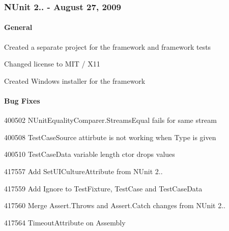 \subsubsection*{N\+Unit 2.. -\/ August 27, 2009}

\paragraph*{General}


\begin{DoxyItemize}
\item Created a separate project for the framework and framework tests
\item Changed license to M\+IT / X11
\item Created Windows installer for the framework
\end{DoxyItemize}

\paragraph*{Bug Fixes}


\begin{DoxyItemize}
\item 400502 N\+Unit\+Equality\+Comparer.\+Streams\+E­qual fails for same stream
\item 400508 Test\+Case\+Source attirbute is not working when Type is given
\item 400510 Test\+Case\+Data variable length ctor drops values
\item 417557 Add Set\+U\+I\+Culture\+Attribute from N\+Unit 2..
\item 417559 Add Ignore to Test\+Fixture, Test\+Case and Test\+Case\+Data
\item 417560 Merge Assert.\+Throws and Assert.\+Catch changes from N\+Unit 2..
\item 417564 Timeout\+Attribute on Assembly 
\end{DoxyItemize}